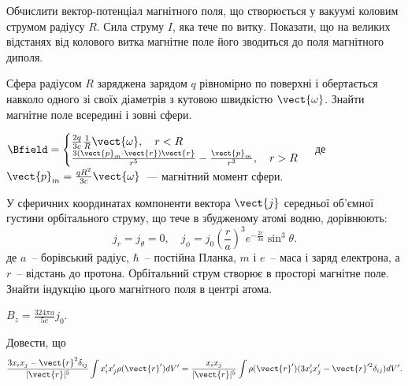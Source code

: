 \begin{problem}
Обчислити вектор-потенціал магнітного поля, що створюється у вакуумі коловим струмом радіусу $R$. Сила струму $I$, яка тече по витку. Показати, що на великих відстанях від колового витка магнітне поле його зводиться до поля магнітного диполя.
\end{problem}

\begin{problem}
Сфера радіусом $R$ заряджена зарядом $q$ рівномірно по поверхні і обертається навколо одного зі своїх діаметрів з кутовою швидкістю $\vect{\omega}$. Знайти магнітне поле всередині і зовні сфери.
\begin{solution}
	$\Bfield =
		\begin{cases}
			\frac{2q}{3c}\frac1R\vect{\omega}, \quad r < R \\
			\frac{3(\vect{p}_m \cdot \vect{r})\vect{r}}{r^5} - \frac{\vect{p}_m}{r^3}, \quad r > R
		\end{cases}
	$
	де $\vect{p}_m = \frac{qR^2}{3c}\vect{\omega}$~--- магнітний момент сфери.
\end{solution}
\end{problem}

\begin{problem}%
У сферичних координатах компоненти вектора $\vect{j}$ середньої об'ємної густини орбітального струму, що тече в збудженому атомі водню, дорівнюють:
\[
	j_r = j_{\theta} = 0, \quad
	j_{\phi} = j_0\left( \frac{r}{a}\right)^3 e^{-\frac{2r}{3a}}\sin^3\theta.
\]
де $a$~-- борівський радіус, $\hbar$~-- постійна Планка, $m$ і $e$~-- маса і заряд електрона, а $r$~-- відстань до протона. Орбітальний струм створює в просторі магнітне поле. Знайти індукцію цього магнітного поля в центрі атома.
\begin{solution}
	$B_z = \frac{324\pi a}{5c}j_0$.
\end{solution}
\end{problem}

\begin{problem}
    Довести, що
    \[
        \frac{3x_ix_j -\vect{r}^2\delta_{ij}}{|\vect{r}|^5}\int x_i'x_j' \rho(\vect{r}')dV' = \frac{x_ix_j}{|\vect{r}|^5} \int\rho(\vect{r}')(3x'_ix'_j -\vect{r}^{\prime2}\delta_{ij})dV'.
    \]
\end{problem}

